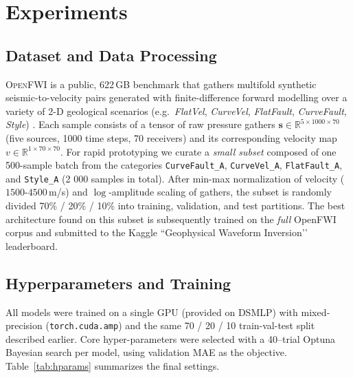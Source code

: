 \documentclass{article}
\newcommand{\instructions}[1]{{\color{blue} #1}}
\begin{document}
\section{Experiments}

\subsection{Dataset and Data Processing}\label{subsec:data}
\textsc{OpenFWI} is a public, 622\,GB benchmark that gathers multi\-fold synthetic seismic-to-velocity pairs generated with finite-difference forward modelling over a variety of 2-D geological scenarios (e.g.\ \emph{FlatVel}, \emph{CurveVel}, \emph{FlatFault}, \emph{CurveFault}, \emph{Style}) \cite{openfwi2021,openfwi2023}.  Each sample consists of a tensor of raw pressure gathers $\mathbf{s}\!\in\!\mathbb{R}^{5\times1000\times70}$ (five sources, 1000 time steps, 70 receivers) and its corresponding velocity map $v\!\in\!\mathbb{R}^{1\times70\times70}$.  
For rapid prototyping we curate a \emph{small subset} composed of one 500-sample batch from the categories \texttt{CurveFault\_A}, \texttt{CurveVel\_A}, \texttt{FlatFault\_A}, and \texttt{Style\_A} (2 000 samples in total).  
After min-max normalization of velocity ($1500$-$4500$\,m/s) and $\log$-amplitude scaling of gathers, the subset is randomly divided 70\% / 20\% / 10\% into training, validation, and test partitions.  
The best architecture found on this subset is subsequently trained on the \emph{full} OpenFWI corpus and submitted to the Kaggle “Geophysical Waveform Inversion’’ leaderboard.


\subsection{Hyperparameters and Training}

All models were trained on a single GPU (provided on DSMLP) with mixed‐precision (\texttt{torch.cuda.amp}) and the same 70 / 20 / 10 train-val-test split described earlier. Core hyper-parameters were selected with a 40–trial Optuna Bayesian search per model, using validation MAE as the objective.  Table~\ref{tab:hparams} summarizes the final settings.
\end{document}
